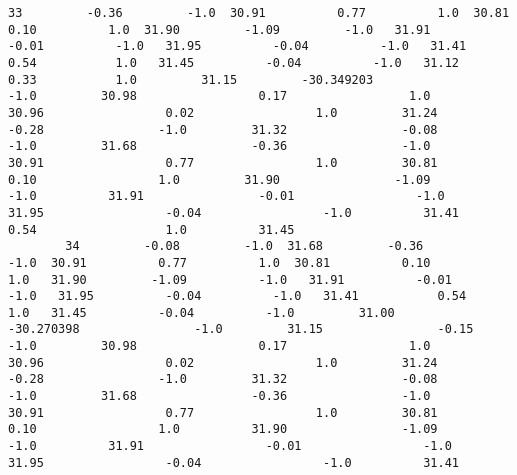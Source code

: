 \documentclass[11pt]{article}
\begin{document}
\begin{Verbatim}[commandchars=\\\{\}]
        33         -0.36         -1.0  30.91          0.77          1.0  30.81          0.10          1.0  31.90         -1.09         -1.0   31.91         -0.01          -1.0   31.95          -0.04          -1.0   31.41           0.54           1.0   31.45          -0.04          -1.0   31.12           0.33           1.0         31.15         -30.349203                -1.0         30.98                 0.17                 1.0         30.96                 0.02                 1.0         31.24                -0.28                -1.0         31.32                -0.08                -1.0         31.68                -0.36                -1.0         30.91                 0.77                 1.0         30.81                 0.10                 1.0         31.90                -1.09                -1.0          31.91                -0.01                 -1.0          31.95                 -0.04                 -1.0          31.41                  0.54                  1.0          31.45   
        34         -0.08         -1.0  31.68         -0.36         -1.0  30.91          0.77          1.0  30.81          0.10          1.0   31.90         -1.09          -1.0   31.91          -0.01          -1.0   31.95          -0.04          -1.0   31.41           0.54           1.0   31.45          -0.04          -1.0         31.00         -30.270398                -1.0         31.15                -0.15                -1.0         30.98                 0.17                 1.0         30.96                 0.02                 1.0         31.24                -0.28                -1.0         31.32                -0.08                -1.0         31.68                -0.36                -1.0         30.91                 0.77                 1.0         30.81                 0.10                 1.0          31.90                -1.09                 -1.0          31.91                 -0.01                 -1.0          31.95                 -0.04                 -1.0          31.41   
        

\end{Verbatim}
\end{document}
